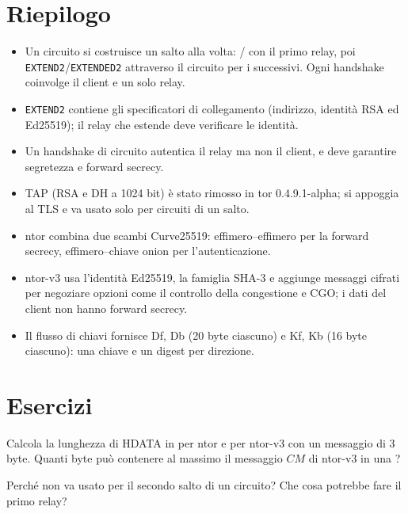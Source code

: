 \section*{Riepilogo}
\begin{itemize}
  \item Un circuito si costruisce un salto alla volta: / con il primo relay, poi \texttt{EXTEND2}/\texttt{EXTENDED2} attraverso il circuito per i successivi. Ogni handshake coinvolge il client e un solo relay.
  \item \texttt{EXTEND2} contiene gli specificatori di collegamento (indirizzo, identità RSA ed Ed25519); il relay che estende deve verificare le identità.
  \item Un handshake di circuito autentica il relay ma non il client, e deve garantire segretezza e forward secrecy.
  \item TAP (RSA e DH a 1024 bit) è stato rimosso in tor 0.4.9.1-alpha;  si appoggia al TLS e va usato solo per circuiti di un salto.
  \item ntor combina due scambi Curve25519: effimero--effimero per la forward secrecy, effimero--chiave onion per l'autenticazione.
  \item ntor-v3 usa l'identità Ed25519, la famiglia SHA-3 e aggiunge messaggi cifrati per negoziare opzioni come il controllo della congestione e CGO; i dati del client non hanno forward secrecy.
  \item Il flusso di chiavi fornisce Df, Db (20 byte ciascuno) e Kf, Kb (16 byte ciascuno): una chiave e un digest per direzione.
\end{itemize}

\section*{Esercizi}

\begin{esercizio}[1]\label{es:09-dimensioni}
Calcola la lunghezza di HDATA in  per ntor e per ntor-v3 con un messaggio di 3 byte. Quanti byte può contenere al massimo il messaggio $CM$ di ntor-v3 in una ?
\end{esercizio}

\begin{esercizio}[1]\label{es:09-fast}
Perché  non va usato per il secondo salto di un circuito? Che cosa potrebbe fare il primo relay?
\end{esercizio}

